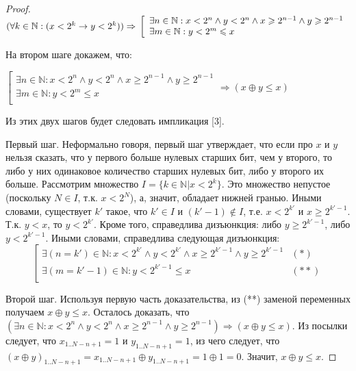 \begin{proof}
$( \forall k \in \mathbb{N} : (x < 2^k \rightarrow y < 2^k )) \Rightarrow\\
\left[\begin{array}{l}
\exists n \in \mathbb{N} : x < 2^n \wedge y < 2^n \wedge x \geqslant 2^{n-1} \wedge y \geqslant 2^{n-1}\\
\exists m \in \mathbb{N} : y < 2^m \leqslant x\\
\end{array}\right.$

На втором шаге докажем, что:

$\left[\begin{array}{l}
\exists n \in \mathbb{N} : x < 2^n \wedge y < 2^n \wedge x \geqslant 2^{n-1} \wedge y \geqslant 2^{n-1}\\
\exists m \in \mathbb{N} : y < 2^m \leqslant x\\
\end{array}\right. \Rightarrow (x \oplus y \leqslant x)$

Из этих двух шагов будет следовать импликация [3].

Первый шаг. Неформально говоря, первый шаг утверждает, что если про $x$ и $y$ нельзя сказать, что у первого больше нулевых старших бит, чем у второго, то либо у них одинаковое количество старших нулевых бит, либо у второго их больше. Рассмотрим множество $I = \{k \in \mathbb{N} | x < 2^k\}$. Это множество непустое (поскольку $N \in I$, т.к. $x < 2^N$), а, значит, обладает нижней гранью. Иными словами, существует $k'$ такое, что $k' \in I$ и $(k'{-}1) \notin I$, т.е. $x < 2^{k'}$ и $x \geqslant 2^{k'-1}$. Т.к. $y < x$, то $y < 2^{k'}$. Кроме того, справедлива дизъюнкция: либо $y \geqslant 2^{k'-1}$, либо $y < 2^{k'-1}$. Иными словами, справедлива следующая дизъюнкция:
$$\left[\begin{array}{lc}
\exists (n = k') \in \mathbb{N} : x < 2^{k'} \wedge y < 2^{k'} \wedge x \geqslant 2^{k'-1} \wedge y \geqslant 2^{k'-1} & (*)\\
\exists (m = k'{-}1) \in \mathbb{N} : y < 2^{k'-1} \leqslant x & (**)\\
\end{array}\right.$$

Второй шаг. Используя первую часть доказательства, из (**) заменой переменных получаем $x \oplus y \leqslant x$. Осталось доказать, что $(\exists n \in \mathbb{N} : x < 2^n \wedge y < 2^n \wedge x \geqslant 2^{n-1} \wedge y \geqslant 2^{n-1}) \Rightarrow (x \oplus y \leqslant x)$. Из посылки следует, что $x_{1..N-n+1} = 1$ и $y_{1..N-n+1} = 1$, из чего следует, что $(x \oplus y)_{1..N-n+1} = x_{1..N-n+1} \oplus y_{1..N-n+1} = 1 \oplus 1 = 0$. Значит, $x\oplus y \leqslant x$.
\end{proof}

